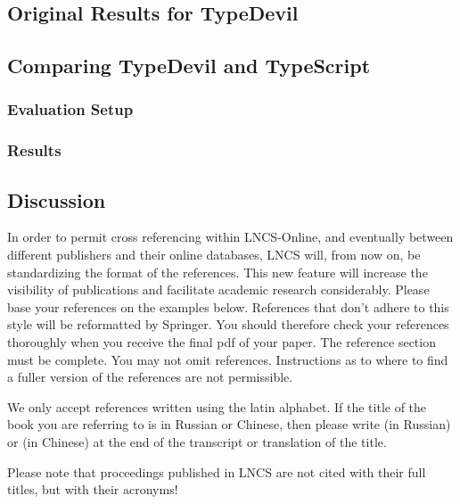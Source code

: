 \documentclass[runningheads,a4paper]{llncs}
\begin{document}
\subsection{Original Results for TypeDevil}

\subsection{Comparing TypeDevil and TypeScript}

\subsubsection{Evaluation Setup}

\subsubsection{Results}


\subsection{Discussion}


In order to permit cross referencing within LNCS-Online, and eventually
between different publishers and their online databases, LNCS will,
from now on, be standardizing the format of the references. This new
feature will increase the visibility of publications and facilitate
academic research considerably. Please base your references on the
examples below. References that don't adhere to this style will be
reformatted by Springer. You should therefore check your references
thoroughly when you receive the final pdf of your paper.
The reference section must be complete. You may not omit references.
Instructions as to where to find a fuller version of the references are
not permissible.

We only accept references written using the latin alphabet. If the title
of the book you are referring to is in Russian or Chinese, then please write
(in Russian) or (in Chinese) at the end of the transcript or translation
of the title.

Please note that proceedings published in LNCS are not cited with their
full titles, but with their acronyms!
\end{document}
